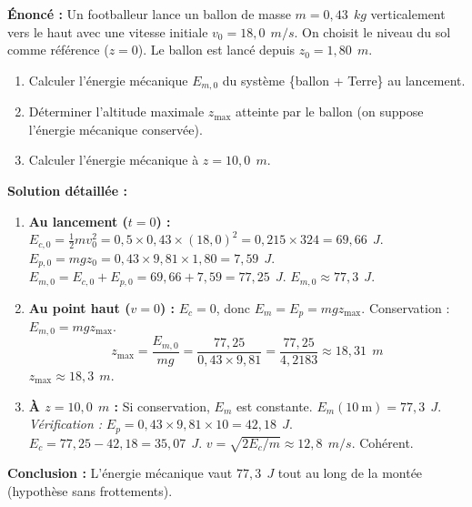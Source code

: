 \documentclass[11pt]{article}
\begin{document}
\begin{exoresolu}
    \textbf{Énoncé :} Un footballeur lance un ballon de masse $m = 0,43\ \SI{}{kg}$ verticalement vers le haut avec une vitesse initiale $v_0 = 18,0\ \SI{}{m/s}$. On choisit le niveau du sol comme référence ($z=0$). Le ballon est lancé depuis $z_0 = 1,80\ \SI{}{m}$.
    \begin{enumerate}
        \item Calculer l'énergie mécanique $E_{m,0}$ du système \{ballon + Terre\} au lancement.
        \item Déterminer l'altitude maximale $z_{\max}$ atteinte par le ballon (on suppose l'énergie mécanique conservée).
        \item Calculer l'énergie mécanique à $z = 10,0\ \SI{}{m}$.
    \end{enumerate}
    \tcblower
    \textbf{Solution détaillée :}
    \begin{enumerate}
        \item \textbf{Au lancement ($t=0$) :}
        $E_{c,0} = \frac{1}{2} m v_0^2 = 0,5 \times 0,43 \times (18,0)^2 = 0,215 \times 324 = 69,66\ \SI{}{J}$.
        $E_{p,0} = m g z_0 = 0,43 \times 9,81 \times 1,80 = 7,59\ \SI{}{J}$.
        $E_{m,0} = E_{c,0} + E_{p,0} = 69,66 + 7,59 = 77,25\ \SI{}{J}$.
        $\boxed{E_{m,0} \approx 77,3\ \SI{}{J}}$.
        \item \textbf{Au point haut ($v=0$) :} $E_c = 0$, donc $E_m = E_p = m g z_{\max}$.
        Conservation : $E_{m,0} = m g z_{\max}$.
        \[ z_{\max} = \frac{E_{m,0}}{m g} = \frac{77,25}{0,43 \times 9,81} = \frac{77,25}{4,2183} \approx 18,31\ \SI{}{m} \]
        $\boxed{z_{\max} \approx 18,3\ \SI{}{m}}$.
        \item \textbf{À $z = 10,0\ \SI{}{m}$ :} Si conservation, $E_m$ est constante.
        $\boxed{E_m(10\ \text{m}) = 77,3\ \SI{}{J}}$.
        \emph{Vérification :} $E_p = 0,43 \times 9,81 \times 10 = 42,18\ \SI{}{J}$. $E_c = 77,25 - 42,18 = 35,07\ \SI{}{J}$. $v = \sqrt{2E_c/m} \approx 12,8\ \SI{}{m/s}$. Cohérent.
    \end{enumerate}
    \textbf{Conclusion :} L'énergie mécanique vaut $77,3\ \SI{}{J}$ tout au long de la montée (hypothèse sans frottements).
\end{exoresolu}
\end{document}
